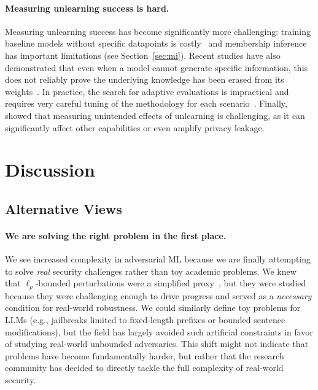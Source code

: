 \paragraph{Measuring unlearning success is hard.} Measuring unlearning success has become significantly more challenging: training baseline models without specific datapoints is costly~\citep{eldan2023s} and membership inference has important limitations (see Section~\ref{sec:mi}). Recent studies have also demonstrated that even when a model cannot generate specific information, this does not reliably prove the underlying knowledge has been erased from its weights~\citep{patil2023can,lynch2024eight,lucki2024adversarial,shumailov2024ununlearning}. In practice, the search for adaptive evaluations is impractical and requires very careful tuning of the methodology for each scenario~\citep{lucki2024adversarial,qi2024evaluating}. Finally, \citet{shi2024muse} showed that measuring unintended effects of unlearning is challenging, as it can significantly affect other capabilities or even amplify privacy leakage.








\section{Discussion}
\label{sec:discussion}

\subsection{Alternative Views}


\paragraph{We are solving the right problem in the first place.}
We see increased complexity in adversarial ML because we are finally attempting to solve \emph{real} security challenges rather than toy academic problems. We knew that $\ell_p$-bounded perturbations were a simplified proxy~\citep{gilmer2018motivating}, but they were studied because they were challenging enough to drive progress and served as a \emph{necessary} condition for real-world robustness. We could similarly define toy problems for LLMs (e.g., jailbreaks limited to fixed-length prefixes or bounded sentence modifications), but the field has largely avoided such artificial constraints in favor of studying real-world unbounded adversaries. This shift might not indicate that problems have become fundamentally harder, but rather that the research community has decided to directly tackle the full complexity of real-world security.




